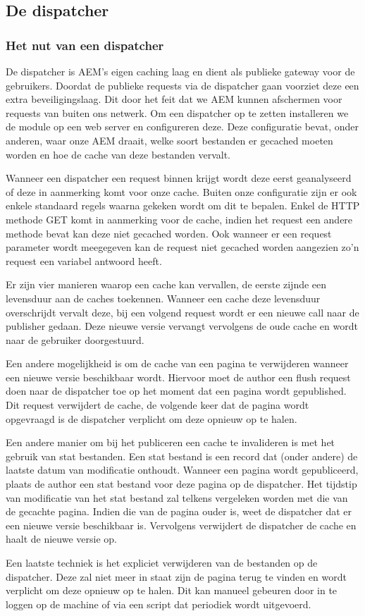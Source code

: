 
	\subsection{De dispatcher}
	\subsubsection{Het nut van een dispatcher}
	De dispatcher is AEM's eigen caching laag en dient als publieke gateway voor de gebruikers. Doordat de publieke requests via de dispatcher gaan voorziet deze een extra beveiligingslaag. Dit door het feit dat we AEM kunnen afschermen voor requests van buiten ons netwerk. Om een dispatcher op te zetten installeren we de module op een web server en configureren deze. Deze configuratie bevat, onder anderen, waar onze AEM draait, welke soort bestanden er gecached moeten worden en hoe de cache van deze bestanden vervalt.
	\par	
	 Wanneer een dispatcher een request binnen krijgt wordt deze eerst geanalyseerd of deze in aanmerking komt voor onze cache. Buiten onze configuratie zijn er ook enkele standaard regels waarna gekeken wordt om dit te bepalen. Enkel de HTTP methode GET komt in aanmerking voor de cache, indien het request een andere methode bevat kan deze niet gecached worden. Ook wanneer er een request parameter wordt meegegeven kan de request niet gecached worden aangezien zo'n request een variabel antwoord heeft.
	\par
	Er zijn vier manieren waarop een cache kan vervallen, de eerste zijnde een levensduur aan de caches toekennen. Wanneer een cache deze levensduur overschrijdt vervalt deze, bij een volgend request wordt er een nieuwe call naar de publisher gedaan. Deze nieuwe versie vervangt vervolgens de oude cache en wordt naar de gebruiker doorgestuurd.
	\par
	Een andere mogelijkheid is om de cache van een pagina te verwijderen wanneer een nieuwe versie beschikbaar wordt. Hiervoor moet de author een flush request doen naar de dispatcher toe op het moment dat een pagina wordt gepublished. Dit request verwijdert de cache, de volgende keer dat de pagina wordt opgevraagd is de dispatcher verplicht om deze opnieuw op te halen.
	\par
	 Een andere manier om bij het publiceren een cache te invalideren is met het gebruik van stat bestanden. Een stat bestand is een record dat (onder andere) de laatste datum van modificatie onthoudt. Wanneer een pagina wordt gepubliceerd, plaats de author een stat bestand voor deze pagina op de dispatcher. Het tijdstip van modificatie van het stat bestand zal telkens vergeleken worden met die van de gecachte pagina. Indien die van de pagina ouder is, weet de dispatcher dat er een nieuwe versie beschikbaar is. Vervolgens verwijdert de dispatcher de cache en haalt de nieuwe versie op.
	 \par
	 Een laatste techniek is het expliciet verwijderen van de bestanden op de dispatcher. Deze zal niet meer in staat zijn de pagina terug te vinden en wordt verplicht om deze opnieuw op te halen. Dit kan manueel gebeuren door in te loggen op de machine of via een script dat periodiek wordt uitgevoerd.
